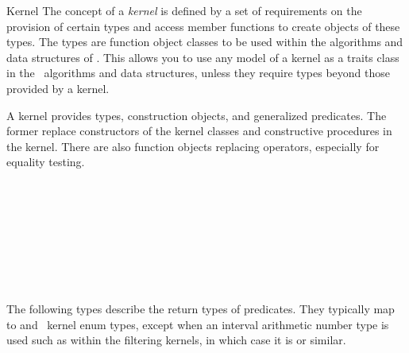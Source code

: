 \begin{ccRefConcept}{Kernel}
The concept of a {\em kernel} is defined by a set of requirements on
the provision of certain types and access member functions to create
objects of these types. The types are function object classes to be used
within the algorithms and data structures of \cgal.
This allows you to use any model of a kernel as a traits class in
the \cgal\ algorithms and data structures, unless they require types
beyond those provided by a kernel.


A kernel provides types, construction objects, and generalized predicates.
The former replace constructors of the kernel classes and constructive
procedures in the kernel. There are also function objects replacing operators,
especially for equality testing.

\ccHasModels

 \\
 \\
 \\
 \\
 \\
 \\
 \\


\ccTypes

\ccGlue
{}

The following types describe the return types of predicates.  They typically
map to  and \cgal\ kernel enum types, except when an interval arithmetic
number type is used such as within the filtering kernels, in which case it is
 or similar.

\ccGlue
{}
\ccGlue
{}
\ccGlue
{}
\ccGlue
{}
\ccGlue
{}
\ccGlue
{}


\end{ccRefConcept}
